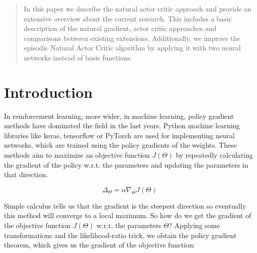 \newpage
\begin{abstract}
In this paper we describe the natural actor critic approach and provide an extensive overview about the current research. This includes a basic description of the natural gradient, actor critic approaches and comparisons between existing extensions. Additionally, we improve the episodic Natural Actor Critic algorithm by applying it with two neural networks instead of basis functions.



\end{abstract}


\newpage
\section{Introduction}
\label{intro}

In reinforcement learning, more wider, in machine learning, policy gradient methods have dominated the field in the last years. Python machine learning libraries like keras, tensorflow or PyTorch are used for implementing neural networks, which are trained using the policy gradients of the weights. These methods aim to maximize an objective function $J(\Theta)$ by repeatedly calculating the gradient of the policy w.r.t. the parameters and updating the parameters in that direction.

\begin{equation}
\label{equ:polupdate}
\Delta_{\Theta} = \alpha \nabla_{\Theta} J(\Theta)
\end{equation}

\noindent Simple calculus tells us that the gradient is the steepest direction so eventually this method will converge to a local maximum. So how do we get the gradient of the objective function $J(\Theta)$ w.r.t. the parameters $\Theta$? Applying some transformations and the likelihood-ratio trick, we obtain the policy gradient theorem, which gives us the gradient of the objective function:

